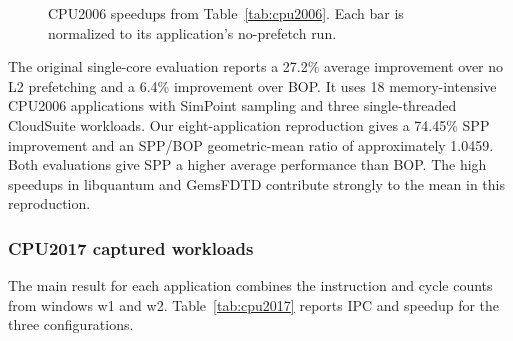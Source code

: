 \documentclass[a4paper,11pt]{article}
\begin{document}
\begin{figure}[htbp]
\centering
{}
\caption{CPU2006 speedups from Table~\ref{tab:cpu2006}. Each bar is normalized to its application's no-prefetch run.}\label{fig:cpu2006}
\end{figure}
\FloatBarrier

The original single-core evaluation reports a 27.2\% average improvement over no L2 prefetching and a 6.4\% improvement over BOP\cite{kim2016}. It uses 18 memory-intensive CPU2006 applications with SimPoint sampling and three single-threaded CloudSuite workloads. Our eight-application reproduction gives a 74.45\% SPP improvement and an SPP/BOP geometric-mean ratio of approximately 1.0459. Both evaluations give SPP a higher average performance than BOP. The high speedups in libquantum and GemsFDTD contribute strongly to the mean in this reproduction.

\subsubsection{CPU2017 captured workloads}
The main result for each application combines the instruction and cycle counts from windows w1 and w2. Table~\ref{tab:cpu2017} reports IPC and speedup for the three configurations.
\end{document}

